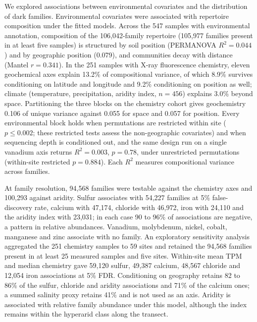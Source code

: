 We explored associations between environmental covariates and the distribution of dark families. Environmental covariates were associated with repertoire composition under the fitted models. Across the 547
samples with environmental annotation, composition of the 106{,}042-family repertoire (105{,}977
families present in at least five samples) is structured by soil position (PERMANOVA $R^2 = 0.044$)
and by geographic position (0.079), and communities decay with distance (Mantel $r = 0.341$). In the
251 samples with X-ray fluorescence chemistry, eleven geochemical axes explain 13.2\% of
compositional variance, of which 8.9\% survives conditioning on latitude and longitude and 9.2\%
conditioning on position as well; climate (temperature, precipitation, aridity index, $n = 456$)
explains 3.0\% beyond space. Partitioning the three blocks on the
chemistry cohort gives geochemistry 0.106 of unique variance against 0.055 for space and 0.057 for
position. Every environmental block holds when permutations are restricted within site
($p \leq 0.002$; these restricted tests assess the non-geographic covariates) and when sequencing depth is conditioned
out, and the same design run on a single vanadium axis returns $R^2 = 0.003$, $p = 0.78$, under unrestricted permutations (within-site restricted $p = 0.884$). Each $R^2$ measures compositional variance across families.

At family resolution, 94{,}568 families were testable against the chemistry axes and 100{,}293
against aridity. Sulfur associates with 54{,}227 families at 5\% false-discovery rate, calcium
with 47{,}174, chloride with 46{,}972, iron with 24{,}110 and the aridity index with 23{,}031; in
each case 90 to 96\% of associations are negative, a pattern in relative abundances. Vanadium, molybdenum, nickel, cobalt,
manganese and zinc associate with no family. An exploratory sensitivity analysis aggregated the 251 chemistry samples to 59 sites and retained the 94{,}568 families present in at least 25 measured samples and five sites. Within-site mean TPM and median chemistry gave 59{,}120 sulfur, 49{,}387 calcium, 48{,}567 chloride and 12{,}054 iron associations at 5\% FDR. Conditioning on geography retains 82 to 86\% of the
sulfur, chloride and aridity associations and 71\% of the calcium ones; a summed salinity proxy
retains 41\% and is not used as an axis. Aridity is associated with relative family abundance under this model, although the index remains within the hyperarid class along the transect.

